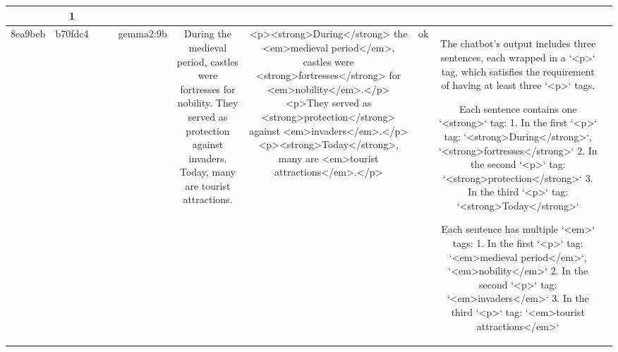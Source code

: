\begin{table}[h!]
\begin{tabular}{|c|c|c|c|c|c|c|c|c|c|}
{{Upon analyzing the chatbot output:

1. There are three `<p>` tags present:
   - `<p><strong>During the medieval period</strong>, <em>castles</em> were <em>fortresses</em> for <em>nobility</em>.</p>`
   - `<p>They served as <strong>protection</strong> against <em>invaders</em>.</p>`
   - `<p>Today, many are <strong>tourist attractions</strong>.</p>`

2. Each `<p>` tag contains the following:
   - The first `<p>` tag has one `<strong>` tag and three `<em>` tags.
   - The second `<p>` tag has one `<strong>` tag and one `<em>` tag.
   - The third `<p>` tag has one `<strong>` tag, but it does not have any `<em>` tags.

Since the third `<p>` tag does not contain any `<em>` tags, it does not fully comply with the requirement to have multiple `<em>` tags within each `<p>` tag. Therefore, this output violates the description requirement that each `<p>` tag should have multiple `<em>` tags.

There is a clear violation of the guideline requiring each `<p>` tag to contain multiple `<em>` tags. Thus, based on the evaluation of whether the output complies with the description, the result is a non-compliance.

ERR & 1\\
\hline
8ea9beb & b70fdc4 &  &  & gemma2:9b & During the medieval period, castles were fortresses for nobility. They served as protection against invaders. Today, many are tourist attractions. & <p><strong>During</strong> the <em>medieval period</em>, castles were <strong>fortresses</strong> for <em>nobility</em>.</p> 
<p>They served as <strong>protection</strong> against <em>invaders</em>.</p> 
<p><strong>Today</strong>, many are <em>tourist attractions</em>.</p>  


 & ok & The chatbot's output includes three sentences, each wrapped in a `<p>` tag, which satisfies the requirement of having at least three `<p>` tags.

Each sentence contains one `<strong>` tag:
1. In the first `<p>` tag: `<strong>During</strong>`, `<strong>fortresses</strong>`
2. In the second `<p>` tag: `<strong>protection</strong>`
3. In the third `<p>` tag: `<strong>Today</strong>`

Each sentence has multiple `<em>` tags:
1. In the first `<p>` tag: `<em>medieval period</em>`, `<em>nobility</em>`
2. In the second `<p>` tag: `<em>invaders</em>`
3. In the third `<p>` tag: `<em>tourist attractions</em>`

}}
\end{tabular}
\end{table}
